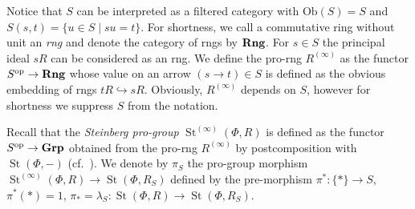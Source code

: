 \documentclass[oneside, 11pt]{amsart} \pdfoutput=1
\newcommand{\St}{\mathop{\mathrm{St}}\nolimits}
\numberwithin{equation}{section}
\theoremstyle{definition}
\newcommand{\catname}[1]{{\normalfont\textbf{#1}}} %
\begin{document}
Notice that $S$ can be interpreted as a filtered category with $\mathrm{Ob}(S) = S$ and $S(s, t) = \{ u \in S \mid su = t \}$.
For shortness, we call a commutative ring without unit an {\it rng} and denote the category of rngs by $\catname{Rng}$.
For $s\in S$ the principal ideal $sR$ can be considered as an rng. We define the pro-rng $R^{(\infty)}$ as the functor $S^\mathrm{op} \to \catname{Rng}$ whose value on an arrow $(s \to t)\in S$ is defined as the obvious embedding of rngs $tR \hookrightarrow sR$. Obviously, $R^{(\infty)}$ depends on $S$, however for shortness we suppress $S$ from the notation.

Recall that the {\it Steinberg pro-group} $\St^{(\infty)}(\Phi, R)$ is defined as the functor $S^\mathrm{op} \to \catname{Grp}$ obtained from the pro-rng $R^{(\infty)}$ by postcomposition with $\St(\Phi, -)$ (cf.~\cite[\S~2.4]{LSV20}). We denote by $\pi_S$ the pro-group morphism $\St^{(\infty)}(\Phi, R) \to \St(\Phi, R_S)$ defined by the pre-morphism $\pi^* \colon \{* \} \to S$, $\pi^*(*) = 1$, $\pi_{*} = \lambda_S \colon \St(\Phi, R) \to \St(\Phi, R_S)$. 
\end{document}

